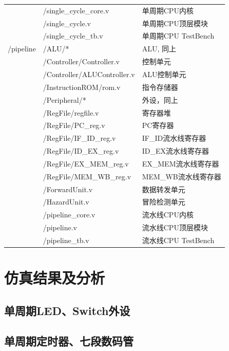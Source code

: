 \documentclass{article}
\begin{document}
\begin{longtable}{l|ll}
                & /single\_cycle\_core.v & 单周期CPU内核 \\
                & /single\_cycle.v & 单周期CPU顶层模块 \\
                & /single\_cycle\_tb.v & 单周期CPU TestBench \\
                \midrule
                /pipeline & /ALU/* & ALU, 同上 \\
                & /Controller/Controller.v & 控制单元 \\
                & /Controller/ALUController.v & ALU控制单元 \\
                & /InstructionROM/rom.v & 指令存储器 \\
                & /Peripheral/* & 外设，同上 \\
                & /RegFile/regfile.v & 寄存器堆 \\
                & /RegFile/PC\_reg.v & PC寄存器 \\
                & /RegFile/IF\_ID\_reg.v & IF\_ID流水线寄存器 \\
                & /RegFile/ID\_EX\_reg.v & ID\_EX流水线寄存器 \\
                & /RegFile/EX\_MEM\_reg.v & EX\_MEM流水线寄存器 \\
                & /RegFile/MEM\_WB\_reg.v & MEM\_WB流水线寄存器 \\
                & /ForwardUnit.v & 数据转发单元 \\
                & /HazardUnit.v & 冒险检测单元 \\
                & /pipeline\_core.v & 流水线CPU内核 \\
                & /pipeline.v & 流水线CPU顶层模块 \\
                & /pipeline\_tb.v & 流水线CPU TestBench \\
            \end{longtable}

    \section{仿真结果及分析}
        \subsection{单周期LED、Switch外设}
            
        \subsection{单周期定时器、七段数码管}
        
\end{document}
